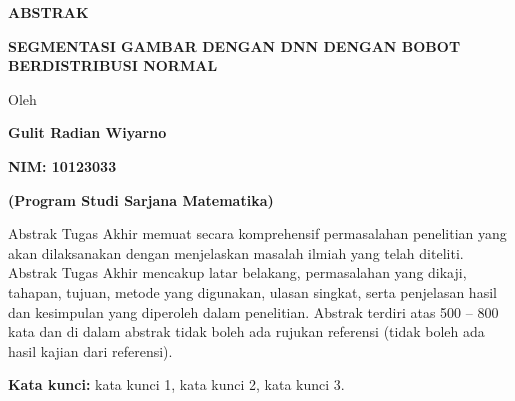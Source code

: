 \documentclass[12pt,a4paper,oneside]{book}
\begin{document}

\newpage
\thispagestyle{plain}
\begin{center}
    {\fontsize{14}{17}\bfseries ABSTRAK\par}
    \vspace{1.0cm}
    {\fontsize{14}{17}\bfseries SEGMENTASI GAMBAR DENGAN DNN DENGAN BOBOT BERDISTRIBUSI NORMAL\par}
    \vspace{0.8cm}
    {\fontsize{12}{15} Oleh\par}
    \vspace{0.2cm}
    {\fontsize{14}{17}\bfseries Gulit Radian Wiyarno\par}
    \vspace{0.2cm}
    {\fontsize{14}{17}\bfseries NIM: 10123033\par}
    \vspace{0.2cm}
    {\fontsize{14}{17}\bfseries (Program Studi Sarjana Matematika)\par}
\end{center}

\vspace{1.0cm}
\noindent
Abstrak Tugas Akhir memuat secara komprehensif permasalahan penelitian yang akan dilaksanakan dengan menjelaskan masalah ilmiah yang telah diteliti. Abstrak Tugas Akhir mencakup latar belakang, permasalahan yang dikaji, tahapan, tujuan, metode yang digunakan, ulasan singkat, serta penjelasan hasil dan kesimpulan yang diperoleh dalam penelitian. Abstrak terdiri atas 500 -- 800 kata dan di dalam abstrak tidak boleh ada rujukan referensi (tidak boleh ada hasil kajian dari referensi).

\vspace{0.8cm}
\noindent
\textbf{Kata kunci:} kata kunci 1, kata kunci 2, kata kunci 3.
\end{document}
